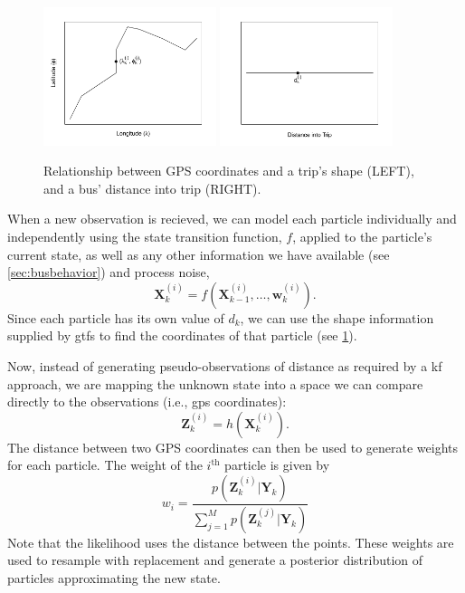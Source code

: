 \documentclass[12pt,a4paper]{article}
\newcommand{\bY}{\mathbf{Y}}
\newcommand{\bX}{\mathbf{X}}
\newcommand{\bZ}{\mathbf{Z}}
\newcommand{\mat}[1]{\mathbf{#1}}
\begin{document}
\begin{figure}[b]
  \centering
  \includegraphics[width=0.45\textwidth]{gps-dist1.jpg}
  \includegraphics[width=0.45\textwidth]{gps-dist2.jpg}
  \caption{Relationship between GPS coordinates and a trip's shape (LEFT), 
    and a bus' distance into trip (RIGHT).}
  \label{fig:gps-dist}
\end{figure}


When a new observation is recieved,
we can model each particle individually and independently using the state transition function, $f$,
applied to the particle's current state,
as well as any other information we have available (see \cref{sec:busbehavior}) and process noise,
\begin{equation}
  \label{eq:pf_statetransition}
  \bX_k^{(i)} = f(\bX_{k-1}^{(i)}, \ldots, \mat{w}_k^{(i)}).
\end{equation}
Since each particle has its own value of $d_k$, 
we can use the shape information supplied by \gls{gtfs} to
find the coordinates of that particle (see \cref{fig:gps-dist}).




Now, instead of generating pseudo-observations of distance
as required by a \gls{kf} approach, we are mapping the unknown state into 
a space we can compare directly to the observations (i.e., \gls{gps} coordinates):
\begin{equation}
  \label{eq:pf_measurement}
  \bZ_k^{(i)} = h(\bX_k^{(i)}).
\end{equation}
The distance between two GPS coordinates can then be used to generate weights for each particle.
The weight of the $i^{\mathrm{th}}$ particle is given by
\begin{equation}
  \label{eq:pf_likelihood}
  w_i = \frac{p(\bZ_k^{(i)} | \bY_k)}{\sum_{j=1}^M p(\bZ_k^{(j)} | \bY_k)}
\end{equation}
Note that the likelihood uses the distance between the points.
These weights are used to resample with replacement and generate a posterior distribution 
of particles approximating the new state.
\end{document}
